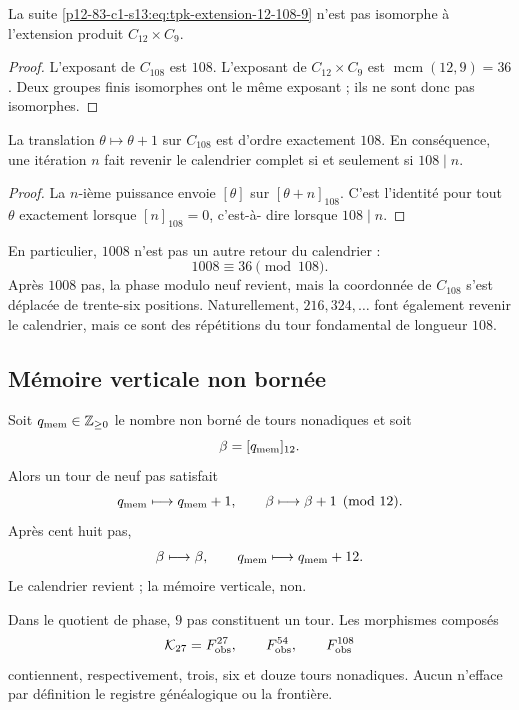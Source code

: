 \begin{proposition}
\label{p12-83-c1-s13:prop:tpk-extension-no-escindida}
La suite \cref{p12-83-c1-s13:eq:tpk-extension-12-108-9} n’est pas isomorphe à l’extension
produit \(C_{12}\times C_9\).
\end{proposition}

\begin{proof}
L’exposant de \(C_{108}\) est \(108\). L’exposant de
\(C_{12}\times C_9\) est
\(\operatorname{mcm}(12,9)=36\). Deux groupes finis isomorphes ont le
même exposant ; ils ne sont donc pas isomorphes.
\end{proof}

\begin{theorem}
\label{p12-83-c1-s13:thm:tpk-periodo-exacto-108}
La translation \(\theta\mapsto\theta+1\) sur \(C_{108}\) est d’ordre
exactement \(108\). En conséquence, une itération \(n\) fait revenir le
calendrier complet si et seulement si \(108\mid n\).
\end{theorem}

\begin{proof}
La \(n\)-ième puissance envoie \([\theta]\) sur \([\theta+n]_{108}\). C’est
l’identité pour tout \(\theta\) exactement lorsque \([n]_{108}=0\), c’est-à-
dire lorsque \(108\mid n\).
\end{proof}

En particulier, \(1008\) n’est pas un autre retour du calendrier :
\[
 1008\equiv36\pmod{108}.
\]
Après \(1008\) pas, la phase modulo neuf revient, mais la coordonnée de
\(C_{108}\) s’est déplacée de trente-six positions. Naturellement,
\(216,324,\ldots\) font également revenir le calendrier, mais ce sont des répétitions du
tour fondamental de longueur \(108\).

\subsection{Mémoire verticale non bornée}

Soit \(q_{\rm mem}\in\mathbb Z_{\geq0}\) le nombre non borné de tours
nonadiques et soit
\[
 \beta=[q_{\rm mem}]_{12}.
\]
Alors un tour de neuf pas satisfait
\[
 q_{\rm mem}\longmapsto q_{\rm mem}+1,
 \qquad
 \beta\longmapsto\beta+1\pmod{12}.
\]
Après cent huit pas,
\[
 \beta\longmapsto\beta,
 \qquad
 q_{\rm mem}\longmapsto q_{\rm mem}+12.
\]
Le calendrier revient ; la mémoire verticale, non.

\begin{corollary}
\label{p12-83-c1-s13:cor:tpk-jerarquia-retornos}
Dans le quotient de phase,
\(9\) pas constituent un tour. Les morphismes composés
\[
 \mathcal K_{27}=F_{\rm obs}^{27},
 \qquad
 F_{\rm obs}^{54},
 \qquad
 F_{\rm obs}^{108}
\]
contiennent, respectivement, trois, six et douze tours nonadiques. Aucun
n’efface par définition le registre généalogique ou la frontière.
\end{corollary}

